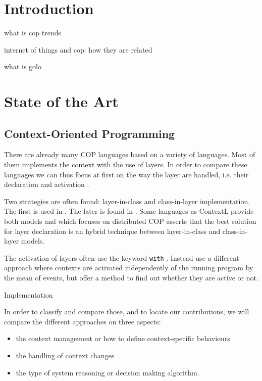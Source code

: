 \documentclass[a4paper]{article}
\begin{document}
\section{Introduction}
what is cop
trends

internet of things and cop: how they are related

what is golo \cite{ponge_golo_2013}

\section{State of the Art}

\subsection{Context-Oriented Programming}


There are already many COP languages based on a variety of languages. Most of them implements the context with the use of layers. In order to compare these languages we can thus focus at first on the way the layer are handled, i.e. their declaration and activation \cite{appeltauer_comparison_2009}.

Two strategies are often found: layer-in-class and class-in-layer implementation. The first is used in \cite{appeltauer_declarative_2012} \cite{appeltauer_dedicated_2008} \cite{appeltauer_improving_2009} \cite{kamina_eventcj:_2011} \cite{nunez_declarative_2009}. The later is found in \cite{lincke_open_2011}. Some languages as ContextL provide both models and \cite{ghezzi_context_2010} which focuses on distributed COP asserts that the best solution for layer declaration is an hybrid technique between layer-in-class and class-in-layer models. 

The activation of layers often use the keyword \lstinline|with| \cite{haupt_contextj:_2011} \cite{appeltauer_declarative_2013} \cite{kamina_eventcj:_2011}. Instead \cite{nunez_declarative_2009} use a different approach where contexts are activated independently of the running program by the mean of events, but offer a method to find out whether they are active or not. 


Implementation

In order to classify and compare those, and to locate our contributions, we will compare the different approaches on three aspects:
\begin{itemize}
  \item the context management or how to define context-specific behaviours
  \item the handling of context changes
  \item the type of system reasoning or decision making algorithm.
\end{itemize}
\end{document}
